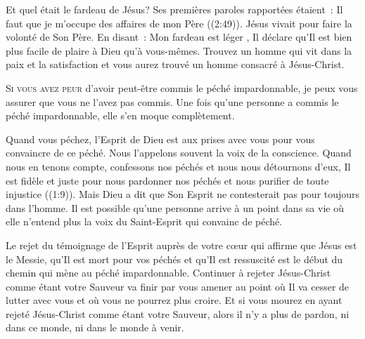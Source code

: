 Et quel était le fardeau de Jésus? Ses premières paroles rapportées
 étaient~:  \og Il faut que je m'occupe
 des affaires de mon Père \fg{} ((2:49)).
 Jésus vivait pour faire la volonté de Son Père. En disant~: 
 \og Mon fardeau est léger \fg{}, Il déclare qu'Il est bien plus facile
 de plaire à Dieu qu'à vous-mêmes.
 Trouvez un homme qui vit dans la paix et la satisfaction
 et vous aurez trouvé un homme consacré à Jésus-Christ. 

\dvrule






\lettrine{S}{i vous avez peur} d'avoir peut-être commis
 le péché impardonnable, je peux vous assurer que vous ne l'avez pas commis.
 Une fois qu'une personne a commis le péché impardonnable,
 elle s'en moque complètement. 


Quand vous péchez, l'Esprit de Dieu est aux prises avec vous pour
 vous convaincre de ce péché. Nous l'appelons souvent la voix
 de la conscience. Quand nous en tenons compte, confessons nos péchés
 et nous nous détournons d'eux, \og Il est fidèle et juste
 pour nous pardonner nos péchés et nous purifier de toute injustice \fg{}
 ((1:9)).
 Mais Dieu a dit que Son Esprit ne contesterait pas pour toujours
 dans l'homme. Il est possible qu'une personne arrive à un point
 dans sa vie où elle n'entend plus la voix du Saint-Esprit 
 qui convainc de péché. 

Le rejet du témoignage de l'Esprit auprès de votre cœur
 \ocadr qui affirme que Jésus est le Messie, qu'Il est mort pour vos péchés
 et qu'Il est ressuscité \fcadr{}
 est le début du chemin qui mène au péché impardonnable.
 Continuer à rejeter Jésus-Christ comme étant votre Sauveur
 va finir par vous amener au point où Il va cesser de lutter avec vous
 et où vous ne pourrez plus croire. Et si vous mourez 
 en ayant rejeté Jésus-Christ comme étant votre Sauveur,
 alors il n'y a plus de pardon, 
 ni dans ce monde, ni dans le monde à venir. 

